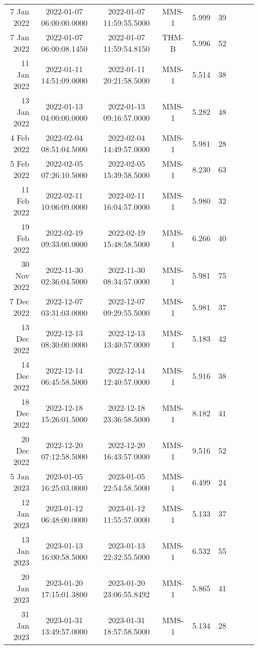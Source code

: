 \begin{longtable}{r|cccccccc}
7 Jan 2022     &  2022-01-07 06:00:00.0000 &  2022-01-07 11:59:55.5000 &  MMS-1 &    5.999 &     39 \\
7 Jan 2022     &  2022-01-07 06:00:08.1450 &  2022-01-07 11:59:54.8150 &  THM-B &    5.996 &     52 \\
11 Jan 2022    &  2022-01-11 14:51:09.0000 &  2022-01-11 20:21:58.5000 &  MMS-1 &    5.514 &     38 \\
13 Jan 2022    &  2022-01-13 04:00:00.0000 &  2022-01-13 09:16:57.0000 &  MMS-1 &    5.282 &     48 \\
4 Feb 2022     &  2022-02-04 08:51:04.5000 &  2022-02-04 14:49:57.0000 &  MMS-1 &    5.981 &     28 \\
5 Feb 2022     &  2022-02-05 07:26:10.5000 &  2022-02-05 15:39:58.5000 &  MMS-1 &    8.230 &     63 \\
11 Feb 2022    &  2022-02-11 10:06:09.0000 &  2022-02-11 16:04:57.0000 &  MMS-1 &    5.980 &     32 \\
19 Feb 2022    &  2022-02-19 09:33:00.0000 &  2022-02-19 15:48:58.5000 &  MMS-1 &    6.266 &     40 \\
30 Nov 2022    &  2022-11-30 02:36:04.5000 &  2022-11-30 08:34:57.0000 &  MMS-1 &    5.981 &     75 \\
7 Dec 2022     &  2022-12-07 03:31:03.0000 &  2022-12-07 09:29:55.5000 &  MMS-1 &    5.981 &     37 \\
13 Dec 2022    &  2022-12-13 08:30:00.0000 &  2022-12-13 13:40:57.0000 &  MMS-1 &    5.183 &     42 \\
14 Dec 2022    &  2022-12-14 06:45:58.5000 &  2022-12-14 12:40:57.0000 &  MMS-1 &    5.916 &     38 \\
18 Dec 2022    &  2022-12-18 15:26:01.5000 &  2022-12-18 23:36:58.5000 &  MMS-1 &    8.182 &     41 \\
20 Dec 2022    &  2022-12-20 07:12:58.5000 &  2022-12-20 16:43:57.0000 &  MMS-1 &    9.516 &     52 \\
5 Jan 2023     &  2023-01-05 16:25:03.0000 &  2023-01-05 22:54:58.5000 &  MMS-1 &    6.499 &     24 \\
12 Jan 2023    &  2023-01-12 06:48:00.0000 &  2023-01-12 11:55:57.0000 &  MMS-1 &    5.133 &     37 \\
13 Jan 2023    &  2023-01-13 16:00:58.5000 &  2023-01-13 22:32:55.5000 &  MMS-1 &    6.532 &     55 \\
20 Jan 2023    &  2023-01-20 17:15:01.3800 &  2023-01-20 23:06:55.8492 &  MMS-1 &    5.865 &     41 \\
31 Jan 2023    &  2023-01-31 13:49:57.0000 &  2023-01-31 18:57:58.5000 &  MMS-1 &    5.134 &     28 \\

\end{longtable}
